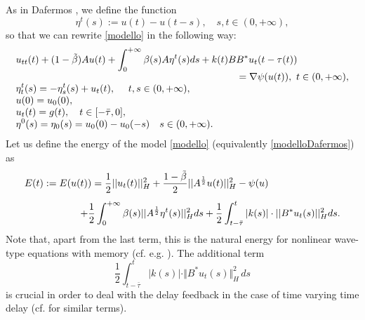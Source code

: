 \documentclass[11pt]{article}
\begin{document}
As in Dafermos \cite{Dafermos}, we define the function
\begin{equation}
\label{eta}
\eta^t(s):=u(t)-u(t-s),\quad s,t\in (0,+\infty),
\end{equation}
so that we can rewrite \eqref{modello} in the following way:
\begin{equation}
\label{modelloDafermos}
\begin{array}{l}
\displaystyle{u_{tt}(t)+(1-\tilde{\beta})Au(t)+\int_0^{+\infty} \beta (s)A\eta^t(s)ds+k(t)BB^*u_t(t-\tau(t))}\\
\displaystyle{\hspace{8 cm}
=\nabla \psi(u(t)),\ t\in(0,+\infty),}\\
\displaystyle{ \eta^t_t(s)=-\eta^t_s(s)+u_t(t),\ \quad t, s\in  (0, +\infty),}\\
\displaystyle{ u(0)=u_0(0),}\\
\displaystyle{u_t(t)= g(t), \quad t\in [-\bar\tau, 0],}\\
\displaystyle{ \eta^0(s)=\eta_0(s)=u_0(0)-u_0(-s)  \quad s\in (0,+\infty).}
\end{array}
\end{equation}
Let us define the energy of the model \eqref{modello} (equivalently \eqref{modelloDafermos}) as
\begin{equation}
\label{energia1}
\begin{array}{l}
\vspace{0.3cm}\displaystyle{E(t):=E (u(t))=\frac{1}{2}||u_t(t)||_H^2+\frac{1-\tilde{\beta}}{2}||A^{\frac 12}u(t)||^2_H-\psi(u)  }\\ \hspace{2 cm}
\displaystyle{ +\frac{1}{2}\int_0^{+\infty} \beta(s) ||A^{\frac 1 2} \eta^t(s)||^2_H ds +\frac{1}{2}\int_{t-\bar\tau}^t |k(s)|\cdot ||B^*u_t(s)||_H^2 ds.}
 \end{array}
\end{equation}
Note that, apart from the last term, this is the natural energy for nonlinear wave-type equations with memory (cf. e.g. \cite{ACS}). The additional term
$$\frac 12\int_{t-\bar\tau}^t\vert k(s)\vert\cdot\Vert B^* u_t(s)\Vert_H^2\, ds$$
 is crucial in order to deal with the delay feedback in the case of  time varying time delay  (cf. \cite{KP, PP_memory} for similar terms).
\end{document}
